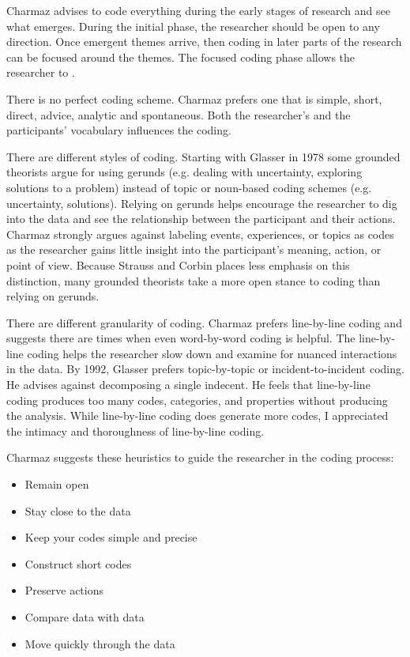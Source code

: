 Charmaz advises to code everything during the early stages of research and see what emerges. During the initial phase, the researcher should be open to any direction. Once emergent themes arrive, then coding in later parts of the research can be focused around the themes. The focused coding phase allows the researcher to  \cite{Charmaz}.

There is no perfect coding scheme. Charmaz prefers one that is simple, short, direct, advice, analytic and spontaneous. Both the researcher's and the participants' vocabulary influences the coding.

There are different styles of coding. Starting with Glasser in 1978 \cite{GlaserTheoreticalSensitivity} some grounded theorists argue for using gerunds (e.g. dealing with uncertainty, exploring solutions to a problem) instead of topic or noun-based coding schemes (e.g. uncertainty, solutions). Relying on gerunds helps encourage the researcher to dig into the data and see the relationship between the participant and their actions. Charmaz strongly argues against labeling events, experiences, or topics as codes as the researcher gains little insight into the participant's meaning, action, or point of view. Because Strauss and Corbin \cite{Strauss1988Basics} places less emphasis on this distinction, many grounded theorists take a more open stance to coding than relying on gerunds.

There are different granularity of coding. Charmaz prefers line-by-line coding and suggests there are times when even word-by-word coding is helpful. The line-by-line coding helps the researcher slow down and examine for nuanced interactions in the data. By 1992, Glasser prefers topic-by-topic or incident-to-incident coding. He advises against decomposing a single indecent. He feels that line-by-line coding produces too many codes, categories, and properties without producing the analysis. While line-by-line coding does generate more codes, I appreciated the intimacy and thoroughness of line-by-line coding.

Charmaz suggests these heuristics to guide the researcher in the coding process:
\begin{itemize}
\item Remain open
\item Stay close to the data
\item Keep your codes simple and precise
\item Construct short codes
\item Preserve actions
\item Compare data with data
\item Move quickly through the data \cite{Charmaz}
\end{itemize}

